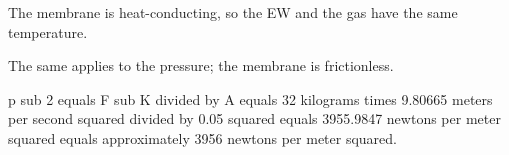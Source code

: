 The membrane is heat-conducting, so the EW and the gas have the same temperature.  

The same applies to the pressure; the membrane is frictionless.  

p sub 2 equals F sub K divided by A equals 32 kilograms times 9.80665 meters per second squared divided by 0.05 squared equals 3955.9847 newtons per meter squared equals approximately 3956 newtons per meter squared.